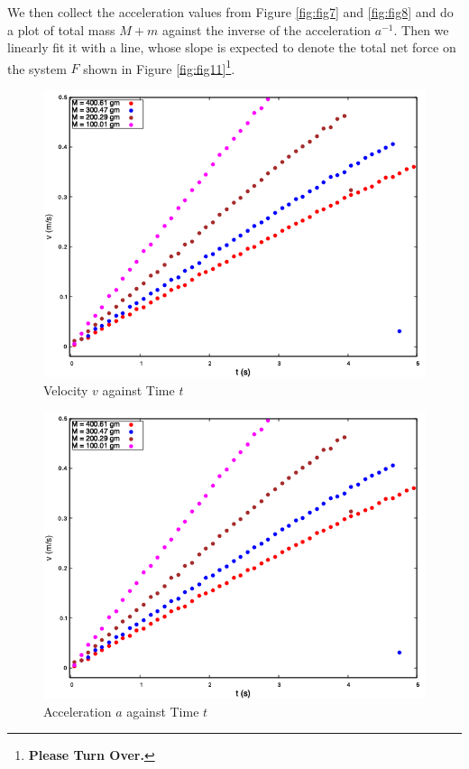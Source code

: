 \documentclass[11pt, a4paper, abstract=true]{scrartcl}
\begin{document}
We then collect the acceleration values from Figure \ref{fig:fig7} and \ref{fig:fig8} and do a plot of total mass \(M + m\) against the inverse of the acceleration \(a^{-1}\). Then we linearly fit it with a line, whose slope is expected to denote the total net force on the system \(F\) shown in Figure \ref{fig:fig11}\footnote{\textbf{Please Turn Over.}}.
\begin{figure}[H]
    \centering
    \includegraphics[scale=0.60]{assets/vt_fixed_force.png}
    \caption{Velocity \(v\) against Time \(t\)}
    \label{fig:fig9}
\end{figure}
\begin{figure}[H]
    \centering
    \includegraphics[scale=0.60]{assets/vt_fixed_force.png}
    \caption{Acceleration \(a\) against Time \(t\)}
    \label{fig:fig10}
\end{figure}
\end{document}
